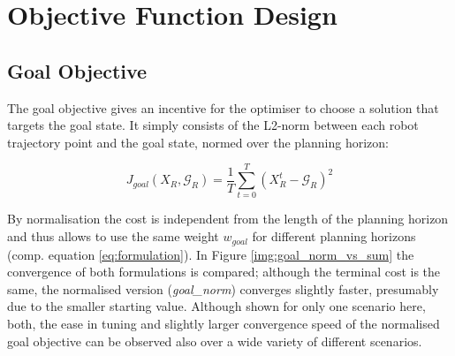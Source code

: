
\section{Objective Function Design}
\label{text:approach/objective}

\subsection{Goal Objective}
\label{text:approach/objective/goal}
The goal objective gives an incentive for the optimiser to choose a solution that targets the goal state. It simply consists of the L2-norm between each robot trajectory point and the goal state, normed over the planning horizon:

\begin{equation}
J_{goal}(X_R, \mathcal{G}_R) = \frac{1}{T} \sum_{t = 0}^T (X_R^t - \mathcal{G}_R)^2
\end{equation}

By normalisation the cost is independent from the length of the planning horizon and thus allows to use the same weight $w_{goal}$ for different planning horizons (comp. equation \ref{eq:formulation}). In Figure \ref{img:goal_norm_vs_sum} the convergence of both formulations is compared; although the terminal cost is the same, the normalised version (\textit{goal\_norm}) converges slightly faster, presumably due to the smaller starting value. Although shown for only one scenario here, both, the ease in tuning and slightly larger convergence speed of the normalised goal objective can be observed also over a wide variety of different scenarios.  

